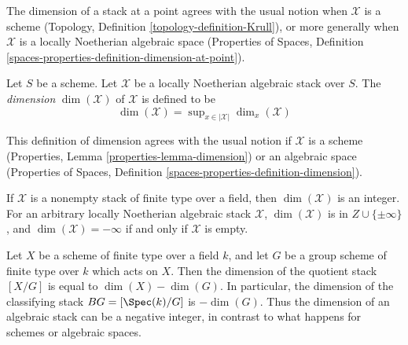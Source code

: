 \noindent
The dimension of a stack at a point agrees with the usual notion
when $\mathcal{X}$ is a scheme (Topology, Definition
\ref{topology-definition-Krull}),
or more generally when $\mathcal{X}$ is a locally Noetherian algebraic space
(Properties of Spaces, Definition
\ref{spaces-properties-definition-dimension-at-point}).

\begin{definition}
\label{definition-dimension}
Let $S$ be a scheme. Let $\mathcal{X}$ be
a locally Noetherian algebraic stack over $S$.
The {\it dimension} $\dim(\mathcal{X})$ of $\mathcal{X}$ is defined to be
$$
\dim(\mathcal{X}) = \sup\nolimits_{x \in |\mathcal{X}|} \dim_x(\mathcal{X})
$$
\end{definition}

\noindent
This definition of dimension agrees with the usual notion
if $\mathcal{X}$ is a scheme
(Properties, Lemma \ref{properties-lemma-dimension})
or an algebraic space (Properties of Spaces, Definition
\ref{spaces-properties-definition-dimension}).

\begin{remark}
\label{remark-dimension-empty-stack}
If $\mathcal{X}$ is a nonempty stack of finite type over a field,
then $\dim(\mathcal{X})$ is an integer. For an arbitrary
locally Noetherian algebraic stack $\mathcal{X}$,
$\dim(\mathcal{X})$ is in $Z\cup \{\pm \infty\}$,
and $\dim(\mathcal{X}) = -\infty$ if and only if $\mathcal{X}$
is empty.
\end{remark}

\begin{example}
\label{example-dimension-quotient-stack}
Let $X$ be a scheme of finite type over a field $k$, and let $G$
be a group scheme of finite type over $k$ which acts on $X$.
Then the dimension of the quotient stack $[X/G]$ is equal to
$\dim(X)-\dim(G)$. In particular, the dimension of the classifying
stack $BG=[\Spec(k)/G]$ is $-\dim(G)$. Thus the dimension of an algebraic
stack can be a negative integer, in contrast to what happens for schemes
or algebraic spaces.
\end{example}









